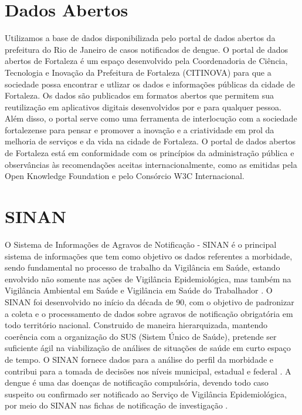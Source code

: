 \documentclass[
	12pt,				%
	openright,			%
	oneside,	
	a4paper,				%
	english,				%
	brazil				%
]{abntex2/abntex2} %
\begin{document}
	\section{Dados Abertos}

	Utilizamos a base de dados disponibilizada pelo portal de dados abertos da prefeitura do Rio de Janeiro de casos notificados de dengue. O portal de dados abertos de Fortaleza é um espaço desenvolvido pela Coordenadoria de Ciência, Tecnologia e Inovação da Prefeitura de Fortaleza (CITINOVA) para que a sociedade possa encontrar e utlizar os dados e informações públicas da cidade de Fortaleza. Os dados são publicados em formatos abertos que permitem sua reutilização em aplicativos digitais desenvolvidos por e para qualquer pessoa. Além disso, o portal serve como uma ferramenta de interlocução com a sociedade fortalezense para pensar e promover  a inovação e a criatividade em prol da melhoria de serviços e da vida na cidade de Fortaleza. O portal de dados abertos de Fortaleza está em conformidade com os princípios da administração pública e observâncias às recomendações aceitas internacionalmente, como as emitidas pela Open Knowledge Foundation e pelo Consórcio W3C Internacional.
		
		
	\section{SINAN}
	
	O Sistema de Informações de Agravos de Notificação - SINAN é o principal sistema de informações que tem como objetivo os dados referentes a morbidade, sendo fundamental no processo de trabalho da Vigilância em Saúde, estando envolvido não somente nas ações de Vigilância Epidemiológica, mas também na Vigilância Ambiental em Saúde e Vigilância em Saúde do Trabalhador \cite{conass:2015}.
	O SINAN foi desenvolvido no início da década de 90, com o objetivo de padronizar a coleta e o processamento de dados sobre agravos de notificação obrigatória em todo território nacional. Construido de maneira hierarquizada, mantendo coerência com a organização do SUS (Sistem Único de Saúde), pretende ser suficiente ágil na viabilização de análises de situações de saúde em curto espaço de tempo. O SINAN fornece dados para a análise do perfil da morbidade e contribui para a tomada de decisões nos níveis municipal, estadual e federal \cite{saude:2008}.
	A dengue é uma das doenças de notificação compulsória, devendo todo caso suspeito ou confirmado ser notificado ao Serviço de Vigilância Epidemiológica, por meio do SINAN nas fichas de notificação de investigação \cite{saude:2008}.
	
\end{document}
